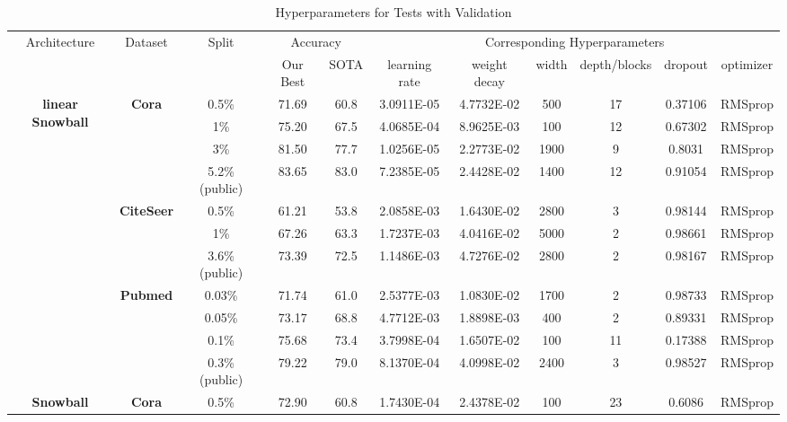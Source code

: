 \begin{table}[htbp]
\setlength{\tabcolsep}{1.5pt}
  \centering
  \caption{Hyperparameters for Tests with Validation}
  \scriptsize
    \begin{tabular}{ccccc|cccccc}
    \midrule\midrule
    \multirow{2}[0]{*}{Architecture} & \multirow{2}[0]{*}{Dataset} & \multirow{2}[0]{*}{Split} & \multicolumn{2}{c|}{Accuracy} & \multicolumn{6}{c}{Corresponding Hyperparameters} \\
          &       &       & Our Best & SOTA  & learning rate & weight decay & width & depth/blocks & dropout & optimizer \\
    \midrule
    \multirow{11}[0]{*}{\textbf{linear Snowball}} & \multirow{4}[0]{*}{\textbf{Cora}} & 0.5\% & 71.69 & 60.8  & 3.0911E-05 & 4.7732E-02 & 500   & 17    & 0.37106 & RMSprop \\
          &       & 1\%   & 75.20 & 67.5  & 4.0685E-04 & 8.9625E-03 & 100   & 12    & 0.67302 & RMSprop \\
          &       & 3\%   & 81.50 & 77.7  & 1.0256E-05 & 2.2773E-02 & 1900  & 9     & 0.8031 & RMSprop \\
          &       & 5.2\% (public) & 83.65 & 83.0  & 7.2385E-05 & 2.4428E-02 & 1400  & 12    & 0.91054 & RMSprop \\
          & \multirow{3}[0]{*}{\textbf{CiteSeer}} & 0.5\% & 61.21 & 53.8  & 2.0858E-03 & 1.6430E-02 & 2800  & 3     & 0.98144 & RMSprop \\
          &       & 1\%   & 67.26 & 63.3  & 1.7237E-03 & 4.0416E-02 & 5000  & 2     & 0.98661 & RMSprop \\
          &       & 3.6\% (public) & 73.39 & 72.5  & 1.1486E-03 & 4.7276E-02 & 2800  & 2     & 0.98167 & RMSprop \\
          & \multirow{4}[0]{*}{\textbf{Pubmed}} & 0.03\% & 71.74 & 61.0  & 2.5377E-03 & 1.0830E-02 & 1700  & 2     & 0.98733 & RMSprop \\
          &       & 0.05\% & 73.17 & 68.8  & 4.7712E-03 & 1.8898E-03 & 400   & 2     & 0.89331 & RMSprop \\
          &       & 0.1\% & 75.68 & 73.4  & 3.7998E-04 & 1.6507E-02 & 100   & 11    & 0.17388 & RMSprop \\
          &       & 0.3\% (public) & 79.22 & 79.0  & 8.1370E-04 & 4.0998E-02 & 2400  & 3     & 0.98527 & RMSprop \\
    \midrule
    \multirow{11}[1]{*}{\textbf{Snowball}} & \multirow{4}[0]{*}{\textbf{Cora}} & 0.5\% & 72.90 & 60.8  & 1.7430E-04 & 2.4378E-02 & 100   & 23    & 0.6086 & RMSprop \\

\end{tabular}
\end{table}
